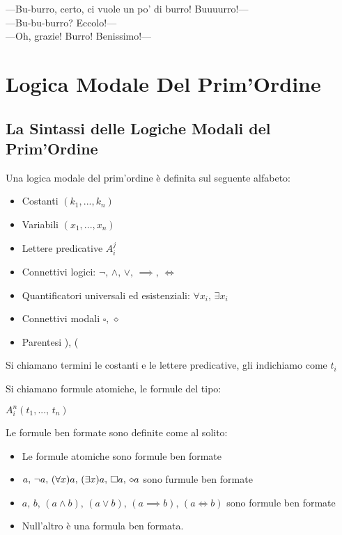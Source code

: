 \begin{savequote}[50mm]
---Bu-burro, certo, ci vuole un po' di burro! Buuuurro!--- \\
---Bu-bu-burro? Eccolo!--- \\
---Oh, grazie! Burro! Benissimo!---
 \end{savequote}


\chapter{Logica Modale Del Prim'Ordine}


\section{La Sintassi delle Logiche Modali del Prim'Ordine}

Una logica modale del prim'ordine è definita sul seguente alfabeto:
\begin{itemize}
\item Costanti $(k_{1},...,k_{n})$
\item Variabili $(x_{1},...,x_{n})$
\item Lettere predicative $A_{i}^{j}$
\item Connettivi logici: $\neg,\,\wedge,\,\vee,\,\implies,\,\iff$
\item Quantificatori universali ed esistenziali: $\forall x_{i},\,\exists x_{i}$
\item Connettivi modali $\square,\,\diamond$
\item Parentesi ), (
\end{itemize}
Si chiamano termini le costanti e le lettere predicative, gli indichiamo
come $t_{i}$

Si chiamano formule atomiche, le formule del tipo:

$A_{i}^{n}(t_{1},...,\, t_{n})$

Le formule ben formate sono definite come al solito:
\begin{itemize}
\item Le formule atomiche sono formule ben formate
\item $a,\,\neg a,\,(\forall x)a,\,(\exists x)a,\,\square a,\,\diamond a$ sono furmule
ben formate
\item $a,\, b,\,(a\wedge b),\,(a\vee b),\,(a\implies b),\,(a\iff b)$ sono
formule ben formate
\item Null'altro è una formula ben formata.
\end{itemize}

